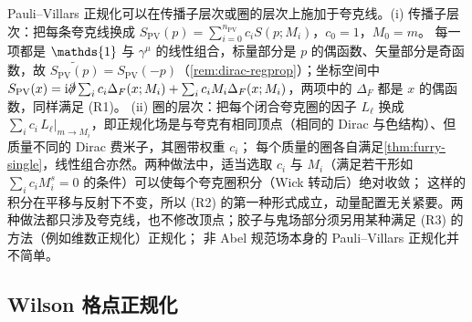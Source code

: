 \documentclass[UTF8,a4paper,11pt,fontset=fandol]{ctexart}
\let\amsmathbb\mathbb
\renewcommand{\mathbb}[1]{\ifx1#1\mathds{1}\else\amsmathbb{#1}\fi}
\theoremstyle{cplain}
\theoremstyle{cdefinition}
\theoremstyle{cremark}
\numberwithin{equation}{section}
\newcommand{\sla}[1]{\slashed{#1}}                  %
\newcommand{\ii}{\mathrm{i}}                        %
\newcommand{\Cconj}[1]{\widetilde{#1}}              %
\begin{document}
Pauli--Villars 正规化\cite{PauliVillars1949}可以在传播子层次或圈的层次上施加于夸克线。(i) 传播子层次：把每条夸克线换成 $S_{\mathrm{PV}}(p)=\sum_{i=0}^{n_{\mathrm{PV}}}c_iS(p;M_i)$，$c_0=1$，$M_0=m$。
每一项都是 $\mathbb 1$ 与 $\gamma^\mu$ 的线性组合，标量部分是 $p$ 的偶函数、矢量部分是奇函数，故 $\Cconj{S_{\mathrm{PV}}(p)}=S_{\mathrm{PV}}(-p)$（\cref{rem:dirac-regprop}）；坐标空间中
$S_{\mathrm{PV}}(x)=\ii\sla\partial\sum_ic_i\Delta_F(x;M_i)+\sum_ic_iM_i\Delta_F(x;M_i)$，两项中的 $\Delta_F$ 都是 $x$ 的偶函数，同样满足 (R1)。
(ii) 圈的层次：把每个闭合夸克圈的因子 $L_\ell$ 换成 $\sum_ic_i\,L_\ell|_{m\to M_i}$，即正规化场是与夸克有相同顶点（相同的 Dirac 与色结构）、但质量不同的 Dirac 费米子，其圈带权重 $c_i$；
每个质量的圈各自满足\cref{thm:furry-single}，线性组合亦然。两种做法中，适当选取 $c_i$ 与 $M_i$（满足若干形如 $\sum_ic_iM_i^s=0$ 的条件）可以使每个夸克圈积分（Wick 转动后）绝对收敛；
这样的积分在平移与反射下不变，所以 (R2) 的第一种形式成立，动量配置无关紧要。两种做法都只涉及夸克线，也不修改顶点；胶子与鬼场部分须另用某种满足 (R3) 的方法（例如维数正规化）正规化；
非 Abel 规范场本身的 Pauli--Villars 正规化并不简单。

\subsection{Wilson 格点正规化}\label{sec:reg-lattice}
\end{document}
